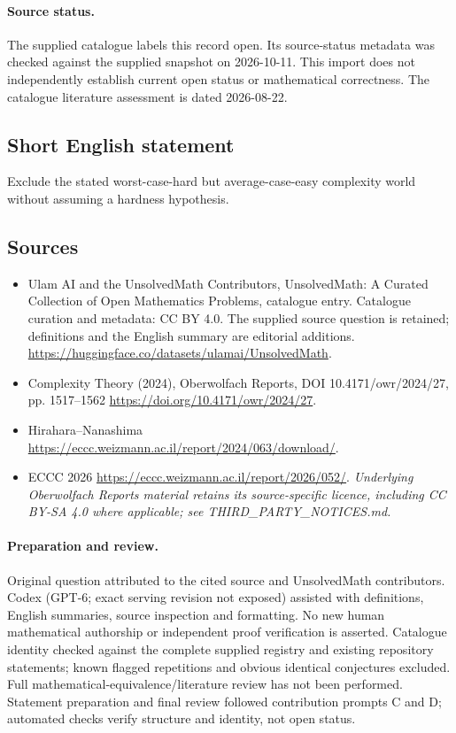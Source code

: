 \documentclass[11pt]{article}
\begin{document}
\paragraph{Source status.}
The supplied catalogue labels this record open. Its source-status metadata was checked against the supplied snapshot on 2026-10-11. This import does not independently establish current open status or mathematical correctness. The catalogue literature assessment is dated 2026-08-22.
\subsection{Short English statement}
Exclude the stated worst-case-hard but average-case-easy complexity world without assuming a hardness hypothesis.
\subsection{Sources}
\begin{itemize}
\item[S1] Ulam AI and the UnsolvedMath Contributors, UnsolvedMath: A Curated Collection of Open Mathematics Problems, catalogue entry. Catalogue curation and metadata: CC BY 4.0. The supplied source question is retained; definitions and the English summary are editorial additions.
\url{https://huggingface.co/datasets/ulamai/UnsolvedMath}.
\item[S2] Complexity Theory (2024), Oberwolfach Reports, DOI 10.4171/owr/2024/27, pp. 1517--1562
\url{https://doi.org/10.4171/owr/2024/27}.
\item[S3] Hirahara--Nanashima
\url{https://eccc.weizmann.ac.il/report/2024/063/download/}.
\item[S4] ECCC 2026
\url{https://eccc.weizmann.ac.il/report/2026/052/}.
\textit{Underlying Oberwolfach Reports material retains its source-specific licence, including CC BY-SA 4.0 where applicable; see THIRD\_PARTY\_NOTICES.md.}
\end{itemize}
\paragraph{Preparation and review.}
Original question attributed to the cited source and UnsolvedMath contributors. Codex (GPT-6; exact serving revision not exposed) assisted with definitions, English summaries, source inspection and formatting. No new human mathematical authorship or independent proof verification is asserted. Catalogue identity checked against the complete supplied registry and existing repository statements; known flagged repetitions and obvious identical conjectures excluded. Full mathematical-equivalence/literature review has not been performed. Statement preparation and final review followed contribution prompts C and D; automated checks verify structure and identity, not open status.
\label{end:statement}
\end{document}
